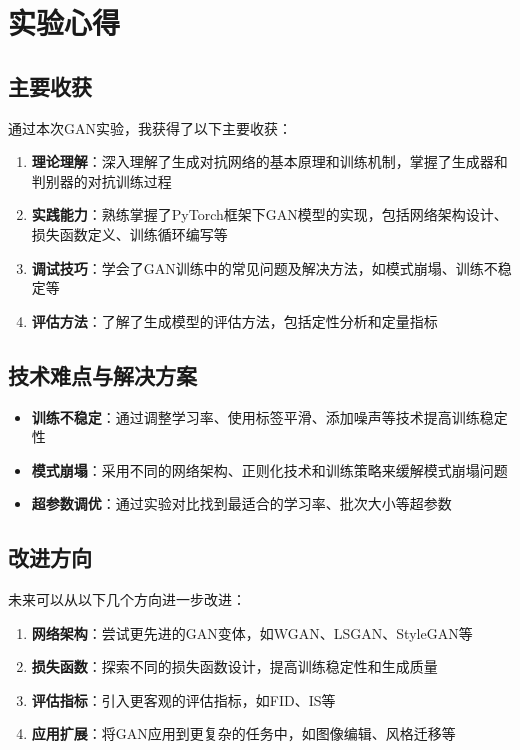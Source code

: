 \documentclass[UTF8]{ctexart}
\begin{document}
\section{实验心得}

\subsection{主要收获}

通过本次GAN实验，我获得了以下主要收获：

\begin{enumerate}
\item \textbf{理论理解}：深入理解了生成对抗网络的基本原理和训练机制，掌握了生成器和判别器的对抗训练过程
\item \textbf{实践能力}：熟练掌握了PyTorch框架下GAN模型的实现，包括网络架构设计、损失函数定义、训练循环编写等
\item \textbf{调试技巧}：学会了GAN训练中的常见问题及解决方法，如模式崩塌、训练不稳定等
\item \textbf{评估方法}：了解了生成模型的评估方法，包括定性分析和定量指标
\end{enumerate}

\subsection{技术难点与解决方案}

\begin{itemize}
\item \textbf{训练不稳定}：通过调整学习率、使用标签平滑、添加噪声等技术提高训练稳定性
\item \textbf{模式崩塌}：采用不同的网络架构、正则化技术和训练策略来缓解模式崩塌问题
\item \textbf{超参数调优}：通过实验对比找到最适合的学习率、批次大小等超参数
\end{itemize}

\subsection{改进方向}

未来可以从以下几个方向进一步改进：

\begin{enumerate}
\item \textbf{网络架构}：尝试更先进的GAN变体，如WGAN、LSGAN、StyleGAN等
\item \textbf{损失函数}：探索不同的损失函数设计，提高训练稳定性和生成质量
\item \textbf{评估指标}：引入更客观的评估指标，如FID、IS等
\item \textbf{应用扩展}：将GAN应用到更复杂的任务中，如图像编辑、风格迁移等
\end{enumerate}
\end{document}
